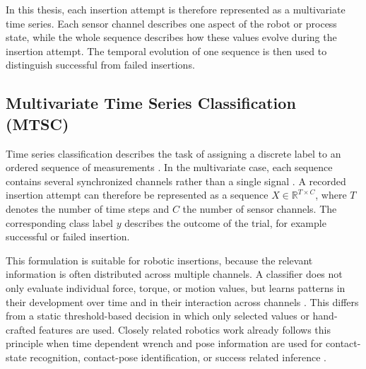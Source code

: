 In this thesis, each insertion attempt is therefore represented as a multivariate time series. Each sensor channel describes one aspect of the robot or process state, while the whole sequence describes how these values evolve during the insertion attempt. The temporal evolution of one sequence is then used to distinguish successful from failed insertions.

\subsection{Multivariate Time Series Classification (MTSC)}

Time series classification describes the task of assigning a discrete label to an ordered sequence of measurements \cite{fawazDeepLearningTime2019,faouziTimeSeriesClassification2024}. In the multivariate case, each sequence contains several synchronized channels rather than a single signal \cite{bagnallUEAMultivariateTime2018,ruizGreatMultivariateTime2021}. A recorded insertion attempt can therefore be represented as a sequence $X \in \mathbb{R}^{T \times C}$, where $T$ denotes the number of time steps and $C$ the number of sensor channels. The corresponding class label $y$ describes the outcome of the trial, for example successful or failed insertion.

This formulation is suitable for robotic insertions, because the relevant information is often distributed across multiple channels. A classifier does not only evaluate individual force, torque, or motion values, but learns patterns in their development over time and in their interaction across channels \cite{fawazDeepLearningTime2019,faouziTimeSeriesClassification2024}. This differs from a static threshold-based decision in which only selected values or hand-crafted features are used. Closely related robotics work already follows this principle when time dependent wrench and pose information are used for contact-state recognition, contact-pose identification, or success related inference \cite{jasimContactstateMonitoringForceguided2014,jinContactPoseIdentification2021a,chanEffectsForceTorqueTactile2019}.


